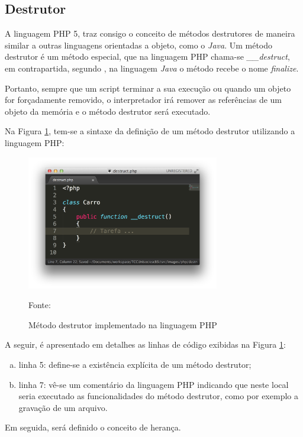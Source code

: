 \subsection{Destrutor}

A linguagem \acs{PHP} 5, traz consigo o conceito de métodos destrutores de maneira
similar a outras linguagens orientadas a objeto, como o \textit{Java}. Um método
destrutor é um método especial, que na linguagem \acs{PHP} chama-se
\textit{\_\_destruct}, em contrapartida, segundo , na
linguagem \textit{Java} o método recebe o nome \textit{finalize}.

Portanto, sempre que um script terminar a sua execução ou quando um objeto for
forçadamente removido, o interpretador irá remover as referências de um objeto
da memória e o método destrutor será executado.

Na Figura \ref{fig:metodoDestrutor}, tem-se a sintaxe da definição de um
método destrutor utilizando a linguagem \acs{PHP}:

\begin{figure}[h!tb]
	\caption{Método destrutor implementado na linguagem PHP}
	\label{fig:metodoDestrutor}

	\centering
	\includegraphics[width=0.75\textwidth]{images/destruct.png}

	\centering
	\footnotesize Fonte: \fonteOAutor
\end{figure}

\FloatBarrier 	%

A seguir, é apresentado em detalhes as linhas de código exibidas na Figura 
\ref{fig:metodoDestrutor}:

\begin{enumerate}[a)]
    \item linha 5: define-se a existência explícita de um método destrutor;
    \item linha 7: vê-se um comentário da linguagem \acs{PHP} indicando que
    neste local seria executado as funcionalidades do método destrutor, como
    por exemplo a gravação de um arquivo.
\end{enumerate}

Em seguida, será definido o conceito de herança.